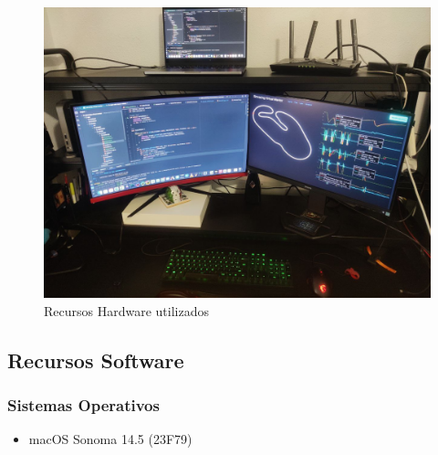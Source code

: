\begin{figure}[H]
	\centering
	\includegraphics[width=0.70\linewidth]{./figs/herramientas/hardware/recursos_hardware.png}
	\caption[Recursos Hardware utilizados]{Recursos Hardware utilizados}
    \label{fig:recursos_hardware}
\end{figure}


\subsection{Recursos Software}
\subsubsection*{Sistemas Operativos}
\begin{itemize}
\item macOS Sonoma 14.5 (23F79) \cite{macos14_5_release_notes}
\end{itemize}

